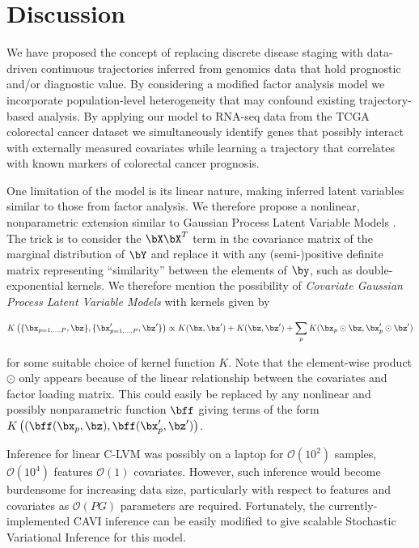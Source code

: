 \section{Discussion}

We have proposed the concept of replacing discrete disease staging with data-driven continuous trajectories inferred from genomics data that hold prognostic and/or diagnostic value. By considering a modified factor analysis model we incorporate population-level heterogeneity that may confound existing trajectory-based analysis. By applying our model to RNA-seq data from the TCGA colorectal cancer dataset we simultaneously identify genes that possibly interact with externally measured covariates while learning a trajectory that correlates with known markers of colorectal cancer prognosis.

One limitation of the model is its linear nature, making inferred latent variables similar to those from factor analysis. We therefore propose a nonlinear, nonparametric extension similar to Gaussian Process Latent Variable Models \cite{lawrence2004gaussian}. The trick is to consider the $\bX\bX^T$ term in the covariance matrix of the marginal distribution of $\bY$ and replace it with any (semi-)positive definite matrix representing ``similarity'' between the elements of $\by$, such as double-exponential kernels. We therefore mention the possibility of \emph{Covariate Gaussian Process Latent Variable Models} with kernels given by

\begin{equation}
K\left( \{\bx_{p = 1, \ldots, P}, \bz\}, \{\bx_{p = 1, \ldots, P}', \bz'\} \right) \propto K(\bx, \bx') + K(\bz, \bz') +
\sum_p K(\bx_p \odot \bz, \bx_p' \odot \bz')
\end{equation}

for some suitable choice of kernel function $K$. Note that the element-wise product $\odot$ only appears because of the linear relationship between the covariates and factor loading matrix. This could easily be replaced by any nonlinear and possibly nonparametric function $\bff$ giving terms of the form $K\left( (\bff(\bx_p, \bz), \bff(\bx_p', \bz') \right)$.

Inference for linear C-LVM was possibly on a laptop for $\mathcal{O}(10^2)$ samples, $\mathcal{O}(10^4)$ features $\mathcal{O}(1)$  covariates. However, such inference would become burdensome for increasing data size, particularly with respect to features and covariates as $\mathcal{O}(PG)$ parameters are required.  Fortunately, the currently-implemented CAVI inference can be easily modified to give scalable Stochastic Variational Inference \cite{hoffman2013stochastic} for this model.
